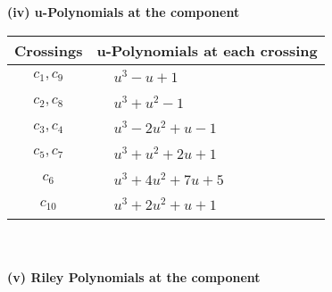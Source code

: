 \documentclass[1p]{elsarticle_modified}
\theoremstyle{definition}
\begin{document}
\newpage\renewcommand{\arraystretch}{1}
\flushleft \textbf{(iv) u-Polynomials at the component}\newline \\
\begin{tabular}{m{50pt}|m{274pt}}
Crossings & \hspace{64pt}u-Polynomials at each crossing \\
\hline $$\begin{aligned}c_{1},c_{9}\end{aligned}$$&$\begin{aligned}
&u^3- u+1
\end{aligned}$\\
\hline $$\begin{aligned}c_{2},c_{8}\end{aligned}$$&$\begin{aligned}
&u^3+u^2-1
\end{aligned}$\\
\hline $$\begin{aligned}c_{3},c_{4}\end{aligned}$$&$\begin{aligned}
&u^3-2 u^2+u-1
\end{aligned}$\\
\hline $$\begin{aligned}c_{5},c_{7}\end{aligned}$$&$\begin{aligned}
&u^3+u^2+2 u+1
\end{aligned}$\\
\hline $$\begin{aligned}c_{6}\end{aligned}$$&$\begin{aligned}
&u^3+4 u^2+7 u+5
\end{aligned}$\\
\hline $$\begin{aligned}c_{10}\end{aligned}$$&$\begin{aligned}
&u^3+2 u^2+u+1
\end{aligned}$\\
\hline
\end{tabular}\\~\\
\newpage\renewcommand{\arraystretch}{1}
\flushleft \textbf{(v) Riley Polynomials at the component}\newline \\
\end{document}
